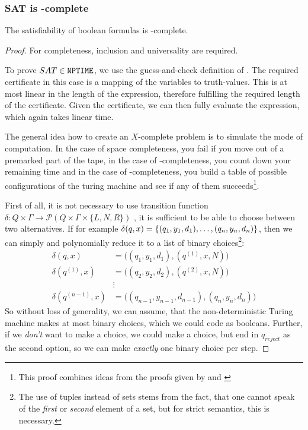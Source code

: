 \subsubsection{SAT is \NPTIME-complete}
\begin{theorem}
	\label{sat-np}
	The satisfiability of boolean formulas is \NPTIME-complete.
\end{theorem}
\begin{proof}
	For completeness, inclusion and universality are required.

	To prove $SAT\in \mathtt{NPTIME}$, we use the guess-and-check definition of 
	\NPTIME. The required certificate in this case is a mapping of the variables to 
	truth-values. This is at most linear in the length of the expression, 
	therefore fulfilling the required \PSPACE length of the certificate. Given the 
	certificate, we can then fully evaluate the expression, which again takes 
	linear time.

	The general idea how to create an $X$-complete problem is to simulate the 
	mode of computation. In the case of space completeness, you fail if you 
	move out of a premarked part of the tape, in the case of 
	\PTIME-completeness, you count down your remaining time and in the case of 
	\NPTIME-completeness, you build a table of possible configurations of the 
	turing machine and see if any of them succeeds\footnote{This proof combines 
		ideas from the proofs given by \cite{jones} and \cite{sipser2006introduction}}.

	First of all, it is not necessary to use transition function 
	$\delta: Q\times \Gamma \rightarrow \mathcal{P}(Q\times \Gamma\times \{L, N, R\})$
	, it is sufficient to be able to choose between two alternatives. If for 
	example $\delta(q, x) = \left\{ (q_1, y_1, d_1), \ldots, (q_n, y_n, d_n) \right\}$, 
	then we can simply and polynomially reduce it to a list of binary 
	choices\footnote{The use of tuples instead of sets stems from the fact, 
	that one cannot speak of the \emph{first} or \emph{second} element of a 
	set, but for strict semantics, this is necessary.}:
	\begin{align}
		\delta(q, x) &= \Big((q_1, y_1, d_1), (q^{(1)}, x, N) \Big)\\
		\delta(q^{(1)}, x) &= \Big((q_2, y_2, d_2), (q^{(2)}, x, N) \Big)\\
		&\vdots \\
		\delta(q^{(n-1)}, x) &= \Big((q_{n-1}, y_{n-1}, d_{n-1}), (q_{n}, y_{n}, d_{n}) \Big)
	\end{align}
	So without loss of generality, we can assume, that the non-deterministic 
	Turing machine makes at most binary choices, which we could code as 
	booleans. Further, if we \emph{don't} want to make a choice, we could make 
	a choice, but end in $q_{reject}$ as the second option, so we can make 
	\emph{exactly} one binary choice per step.


\end{proof}
